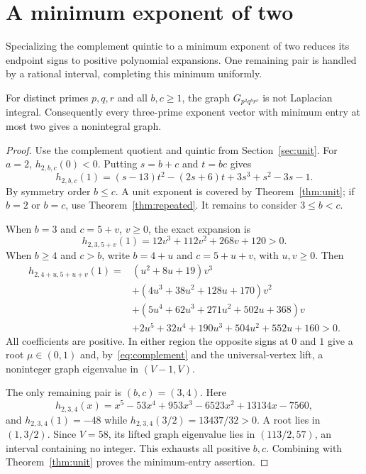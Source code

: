 \section{A minimum exponent of two}
\label{sec:minimum-two}

Specializing the complement quintic to a minimum exponent of two
reduces its endpoint signs to positive polynomial expansions. One remaining
pair is handled by a rational interval, completing this minimum uniformly.

\begin{theorem}
\label{thm:minimum-two}
For distinct primes $p,q,r$ and all $b,c\geq1$, the graph
$G_{p^2q^br^c}$ is not Laplacian integral. Consequently every
three-prime exponent vector with minimum entry at most two gives a
nonintegral graph.
\end{theorem}

\begin{proof}
Use the complement quotient and quintic from Section~\ref{sec:unit}.
For $a=2$, $h_{2,b,c}(0)<0$. Putting $s=b+c$ and $t=bc$ gives
\[
h_{2,b,c}(1)=(s-13)t^2-(2s+6)t+3s^3+s^2-3s-1.
\]
By symmetry order $b\leq c$. A unit exponent is covered by
Theorem~\ref{thm:unit}; if $b=2$ or $b=c$, use
Theorem~\ref{thm:repeated}. It remains to consider $3\leq b<c$.

When $b=3$ and $c=5+v$, $v\geq0$, the exact expansion is
\[
h_{2,3,5+v}(1)=12v^3+112v^2+268v+120>0.
\]
When $b\geq4$ and $c>b$, write $b=4+u$ and $c=5+u+v$, with
$u,v\geq0$. Then
\begin{align*}
h_{2,4+u,5+u+v}(1)
={}&(u^2+8u+19)v^3\\
&+(4u^3+38u^2+128u+170)v^2\\
&+(5u^4+62u^3+271u^2+502u+368)v\\
&+2u^5+32u^4+190u^3+504u^2+552u+160>0.
\end{align*}
All coefficients are positive. In either region the opposite signs at
$0$ and $1$ give a root $\mu\in(0,1)$ and, by~\eqref{eq:complement}
and the universal-vertex lift, a noninteger graph eigenvalue in $(V-1,V)$.

The only remaining pair is $(b,c)=(3,4)$. Here
\[
h_{2,3,4}(x)=x^5-53x^4+953x^3-6523x^2+13134x-7560,
\]
and $h_{2,3,4}(1)=-48$ while
$h_{2,3,4}(3/2)=13437/32>0$. A root lies in $(1,3/2)$.
Since $V=58$, its lifted graph eigenvalue lies in $(113/2,57)$,
an interval containing no integer. This exhausts all positive $b,c$.
Combining with Theorem~\ref{thm:unit} proves the minimum-entry assertion.
\end{proof}
